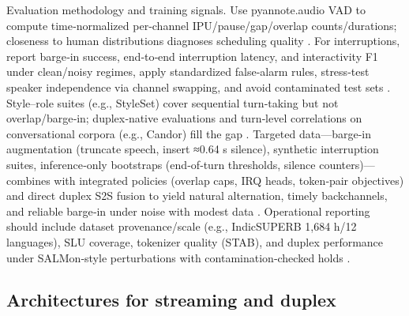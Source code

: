 \documentclass{article}
\begin{document}
Evaluation methodology and training signals. Use pyannote.audio VAD to compute time‑normalized per‑channel IPU/pause/gap/overlap counts/durations; closeness to human distributions diagnoses scheduling quality \cite{lu2025slideintegratingspeechlanguagemodelllmsp}. For interruptions, report barge‑in success, end‑to‑end interruption latency, and interactivity F1 under clean/noisy regimes, apply standardized false‑alarm rules, stress‑test speaker independence via channel swapping, and avoid contaminated test sets \cite{maimon2025salmonsuiteacousticlanguagemodelevaluati,tseng2025evaluationllmsspeechisoftenflawedtestset,wang2025ntppgenerativespeechlanguagemodelingdual}. Style–role suites (e.g., StyleSet) cover sequential turn‑taking but not overlap/barge‑in; duplex‑native evaluations and turn‑level correlations on conversational corpora (e.g., Candor) fill the gap \cite{chiang2025audioawarelargelanguagemodelsasjudgesspe,cui2025thinkbeforeyoutalkenhancingmeaningfuldia}. Targeted data—barge‑in augmentation (truncate speech, insert ≈0.64 s silence), synthetic interruption suites, inference‑only bootstraps (end‑of‑turn thresholds, silence counters)—combines with integrated policies (overlap caps, IRQ heads, token‑pair objectives) and direct duplex S2S fusion to yield natural alternation, timely backchannels, and reliable barge‑in under noise with modest data \cite{hu2025salmduplexefficientdirectmodelingspeechl,wang2023slmbridgethingapbetweenspeechtextfoundat,wang2025dualspeechlmtowardsunifiedspeechundersta}. Operational reporting should include dataset provenance/scale (e.g., IndicSUPERB 1,684 h/12 languages), SLU coverage, tokenizer quality (STAB), and duplex performance under SALMon‑style perturbations with contamination‑checked holds \cite{entry2025indicsuperbspeechprocessinguniversalperf,vashishth2024stabspeechtokenizerassessmentbenchmark,maimon2025salmonsuiteacousticlanguagemodelevaluati,yang2024buildingtaiwanesemandarinspokenlanguagem}.



\subsection{Architectures for streaming and duplex} \label{subsec:Architectures for streaming and duplex}
\end{document}
